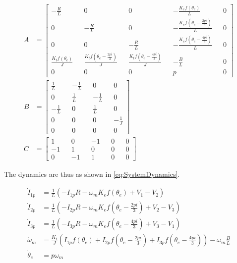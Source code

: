 \documentclass[]{report}
\begin{document}
\begin{equation}\label{eq:SystemMatricesDelta}
	\begin{split}
	A &= \begin{bmatrix}
			-\frac{R}{L} && 0 && 0 && -\frac{K_e f\left(\theta_e\right)}{L} && 0 \\
			0 && -\frac{R}{L} && 0 && -\frac{K_e f\left(\theta_e - \frac{2pi}{3}\right)}{L} && 0 \\
			0 && 0 && -\frac{R}{L} && -\frac{K_e f\left(\theta_e - \frac{4pi}{3}\right)}{L} && 0 \\
			\frac{K_t f\left(\theta_e\right)}{J} && \frac{K_t f\left(\theta_e - \frac{2pi}{3}\right)}{J} && \frac{K_t f\left(\theta_e - \frac{4pi}{3}\right)}{J} && - \frac{B}{L} && 0 \\
			0 && 0 && 0 && p && 0
		 \end{bmatrix} \\
	 B &= \begin{bmatrix}
	 		\frac{1}{L} && -\frac{1}{L} && 0 && 0 \\
	 		0 && \frac{1}{L} && -\frac{1}{L} && 0 \\
	 		-\frac{1}{L} && 0 && \frac{1}{L} && 0 \\
	 		0 && 0 && 0 && -\frac{1}{J} \\
	 		0 && 0 && 0 && 0
	 	\end{bmatrix} \\
 	C &= \begin{bmatrix}
	 		1 && 0 && -1 && 0 && 0 \\
	 		-1 && 1 && 0 && 0 && 0 \\
	 		0 && -1 && 1 && 0 && 0
 		\end{bmatrix}
 	\end{split}
\end{equation}

The dynamics are thus as shown in \autoref{eq:SystemDynamics}.

\begin{equation}\label{eq:SystemDynamics}
	\begin{split}
	\dot{I}_{1p} &= \frac{1}{L} \left( -I_{1p} R - \omega_m K_e f\left(\theta_e\right) + V_1 - V_2 \right) \\
	\dot{I}_{2p} &= \frac{1}{L} \left( -I_{2p} R - \omega_m K_e f\left(\theta_e - \frac{2pi}{3}\right) + V_2 - V_3 \right) \\
	\dot{I}_{3p} &= \frac{1}{L} \left( -I_{3p} R - \omega_m K_e f\left(\theta_e - \frac{4pi}{3}\right) + V_3 - V_1 \right) \\
	\dot{\omega}_m &= \frac{K_t}{J} \left( I_{1p} f\left(\theta_e\right) + I_{2p} f\left(\theta_e - \frac{2pi}{3}\right) + I_{3p} f\left(\theta_e - \frac{4pi}{3}\right) \right) - \omega_m \frac{B}{L} \\
	\dot{\theta}_e &= p \omega_m
 	\end{split}
\end{equation}
\end{document}
